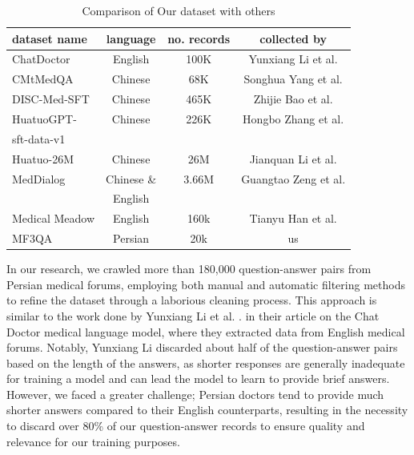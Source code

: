 \documentclass[conference]{IEEEtran}
\begin{document}
	\begin{table}[ht]
		\centering
		\caption{Comparison of Our dataset with others}
		\begin{tabular}{|l|c|c|c|}  %
			\hline
			dataset name            &language & no. records & collected by \\ \hline
			ChatDoctor 	   &English	 & 100K        & Yunxiang Li et al.
			\cite{b6}
			\\ \hline
			CMtMedQA  	   &Chinese	 & 68K        &  Songhua Yang et al.
			\cite{b21}
			\\ \hline
			DISC-Med-SFT	   &Chinese	 & 465K       & Zhijie Bao et al.   
			\cite{b22}
			\\ \hline
			HuatuoGPT-	   &Chinese	 & 226K        & Hongbo Zhang et al.   
			\cite{b23}
			\\ 
			sft-data-v1	   &	     &             & 	\\ \hline
			Huatuo-26M	   &Chinese	 & 26M         & Jianquan Li et al.
			\cite{b24}
			\\ \hline
			MedDialog       &Chinese \&&3.66M       & Guangtao Zeng et al.  \\ 
			&English  &             &  \cite{b25} \\ \hline
			Medical Meadow  &English  & 160k        & Tianyu Han et al. 
			\cite{b26}
			\\ \hline
			MF3QA           &Persian  & 20k            & us \\ \hline
		\end{tabular}
		\label{tab:model_results_on_mcqa}
	\end{table}
	
	
	In our research, we crawled more than 180,000 question-answer pairs from Persian medical forums, employing both manual and automatic filtering methods to refine the dataset through a laborious cleaning process. This approach is similar to the work done by Yunxiang Li et al.
	\cite{b6}.
	in their article on the Chat Doctor medical language model, where they extracted data from English medical forums. Notably, Yunxiang Li discarded about half of the question-answer pairs based on the length of the answers, as shorter responses are generally inadequate for training a model and can lead the model to learn to provide brief answers. However, we faced a greater challenge; Persian doctors tend to provide much shorter answers compared to their English counterparts, resulting in the necessity to discard over 80\% of our question-answer records to ensure quality and relevance for our training purposes.
	
\end{document}
